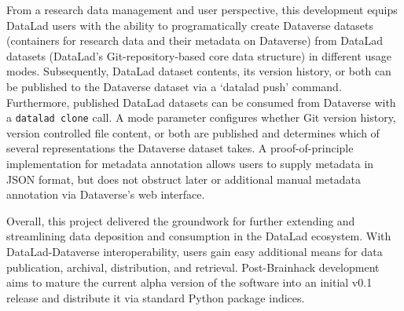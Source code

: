 \documentclass[../main.tex]{subfiles}
\begin{document}
From a research data management and user perspective, this development equips DataLad users with the ability to programatically create Dataverse datasets (containers for research data and their metadata on Dataverse) from DataLad datasets (DataLad’s Git-repository-based core data structure) in different usage modes. Subsequently, DataLad dataset contents, its version history, or both can be published to the Dataverse dataset via a ‘datalad push’ command. Furthermore, published DataLad datasets can be consumed from Dataverse with a \texttt{datalad clone} call. A mode parameter configures whether Git version history, version controlled file content, or both are published and determines which of several representations the Dataverse dataset takes. A proof-of-principle implementation for metadata annotation allows users to supply metadata in JSON format, but does not obstruct later or additional manual metadata annotation via Dataverse’s web interface.

Overall, this project delivered the groundwork for further extending and streamlining data deposition and consumption in the DataLad ecosystem. With DataLad-Dataverse interoperability, users gain easy additional means for data publication, archival, distribution, and retrieval. Post-Brainhack development aims to mature the current alpha version of the software into an initial v0.1 release and distribute it via standard Python package indices.
\end{document}
